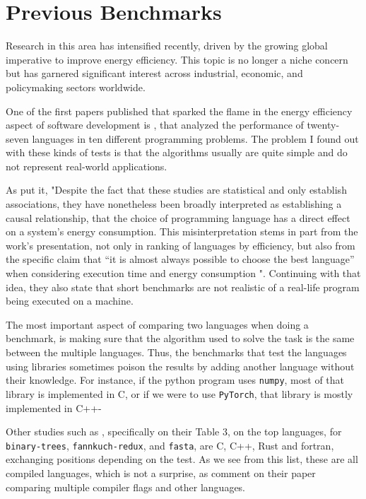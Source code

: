 \section{Previous Benchmarks}

Research in this area has intensified recently, driven by the growing global imperative to improve energy efficiency. This topic is no longer a niche concern but has garnered significant interest across industrial, economic, and policymaking sectors worldwide.

One of the first papers published that sparked the flame in the energy efficiency aspect of software development is \textcite{energy-efficiency-rui-v1}, that analyzed the performance of twenty-seven languages in ten different programming problems. The problem I found out with these kinds of tests is that the algorithms usually are quite simple and do not represent real-world applications. 

As \textcite{vankempen2025itseasygreenenergy} put it, "Despite the fact that these studies are statistical and only establish associations, they have nonetheless been broadly interpreted as establishing a causal relationship, that the choice of programming language has a direct effect on a system’s energy consumption. This misinterpretation stems in part from the work’s presentation, not only in ranking of languages by efficiency, but also from the specific claim that “it is almost always possible to choose the best language” when considering execution time and energy consumption \cite{ranking-rui-pereira}". Continuing with that idea, they also state that short benchmarks are not realistic of a real-life program being executed on a machine.

The most important aspect of comparing two languages when doing a benchmark, is making sure that the algorithm used to solve the task is the same between the multiple languages. Thus, the benchmarks that test the languages using libraries sometimes poison the results by adding another language without their knowledge. For instance, if the python program uses \texttt{\gls{numpy}}, most of that library is implemented in C, or if we were to use \texttt{\gls{PyTorch}}, that library is mostly implemented in C++-

Other studies such as \cite{ranking-rui-pereira}, specifically on their Table 3, on the top languages, for \texttt{binary-trees}, \texttt{fannkuch-redux}, and \texttt{fasta}, are C, C++, Rust and \gls{fortran}, exchanging positions depending on the test. As we see from this list, these are all compiled languages, which is not a surprise, as \textcite{imact-compiler} comment on their paper comparing multiple compiler flags and other languages. 


